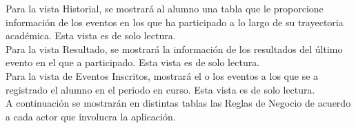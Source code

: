 Para la vista Historial, se mostrará al alumno una tabla que le proporcione información de los eventos en los que ha participado a lo largo de su trayectoria académica. Esta vista es de solo lectura.\\

Para la vista Resultado, se mostrará la información de los resultados del último evento en el que a participado. Esta vista es de solo lectura.\\

Para la vista de Eventos Inscritos, mostrará el o los eventos a los que se a registrado el alumno en el periodo en curso. Esta vista es de solo lectura.\\

\noindent A continuación se mostrarán en distintas tablas las Reglas de Negocio de acuerdo a cada actor que involucra la aplicación.

